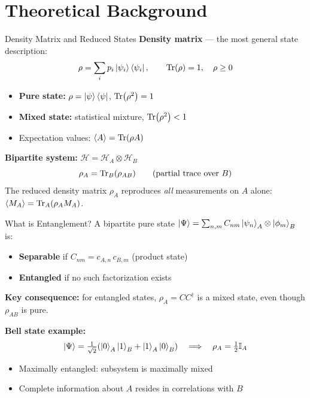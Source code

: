 \documentclass[aspectratio=169,11pt]{beamer}
\begin{document}
\section{Theoretical Background}

\begin{frame}{Density Matrix and Reduced States}
    \textbf{Density matrix} --- the most general state description:
    \[
        \rho = \sum_i p_i\ket{\psi_i}\bra{\psi_i}, \qquad \Tr(\rho)=1, \quad \rho \geq 0
    \]
    \begin{itemize}
        \item \textbf{Pure state:} $\rho = \ket{\psi}\bra{\psi}$, $\Tr(\rho^2) = 1$
        \item \textbf{Mixed state:} statistical mixture, $\Tr(\rho^2) < 1$
        \item Expectation values: $\langle A \rangle = \Tr(\rho A)$
    \end{itemize}

    \vspace{0.2cm}
    \textbf{Bipartite system:} $\mathcal{H} = \mathcal{H}_A \otimes \mathcal{H}_B$
    \[
        \rho_A = \Tr_B(\rho_{AB}) \qquad \text{(partial trace over } B \text{)}
    \]
    The reduced density matrix $\rho_A$ reproduces \emph{all} measurements on $A$ alone:
    $\langle M_A \rangle = \Tr_A(\rho_A M_A)$.
\end{frame}

\begin{frame}{What is Entanglement?}
    A bipartite pure state $\ket{\Psi} = \sum_{n,m} C_{nm}\ket{\psi_n}_A \otimes \ket{\phi_m}_B$ is:
    \begin{itemize}
        \item \textbf{Separable} if $C_{nm} = c_{A,n}\, c_{B,m}$ (product state)
        \item \textbf{Entangled} if no such factorization exists
    \end{itemize}

    \vspace{0.1cm}
    \textbf{Key consequence:} for entangled states, $\rho_A = CC^\dagger$ is a \alert{mixed state}, even though $\rho_{AB}$ is pure.

    \vspace{0.1cm}
    \textbf{Bell state example:}
    \[
        \ket{\Psi} = \tfrac{1}{\sqrt{2}}(\ket{0}_A\ket{1}_B + \ket{1}_A\ket{0}_B) \quad \Longrightarrow \quad \rho_A = \tfrac{1}{2}\mathbb{I}_A
    \]
    \begin{itemize}
        \item Maximally entangled: subsystem is maximally mixed
        \item Complete information about $A$ resides in correlations with $B$
    \end{itemize}
\end{frame}
\end{document}
